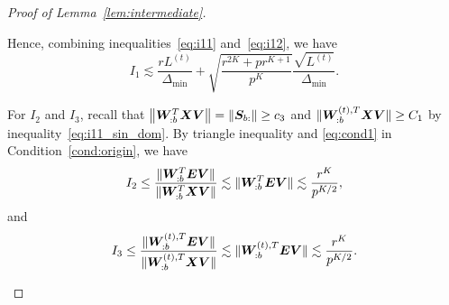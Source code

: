 \documentclass[lettersize,journal]{IEEEtran}
\theoremstyle{definition}
\theoremstyle{definition}
\newcommand{\of}[1]{\left(#1\right)}
\newcommand{\aabs}[1]{\left|#1\right|}
\begin{document}
\begin{proof}[Proof of Lemma~\ref{lem:intermediate}]
\begin{enumerate}
     
    Hence, combining inequalities~\eqref{eq:i11} and~\eqref{eq:i12},  we have 
    \begin{equation}\label{eq:i1}
        I_1 \lesssim \frac{r L^{(t)}}{\Delta_{\min}} + \sqrt{\frac{ r^{2K} + p r^{K+1}}{p^K}} \frac{\sqrt{L^{(t)}}}{\Delta_{\min}}.
    \end{equation}
    
    
    
    For $I_2$ and $I_3$, recall that $\left\lVert\bm{W}_{:b}^T \bm X \bm{V}\right\rVert = \left\lVert\bm S_{b:}\right\rVert \geq c_3$ and $\lVert  \bm{W}_{:b}^{(t),T} \bm X \bm{V} \rVert \geq C_1$ by inequality~\eqref{eq:i11_sin_dom}. By triangle inequality and \eqref{eq:cond1} in Condition~\ref{cond:origin}, we have 
    \begin{equation}\label{eq:i2}
         I_2 \leq \frac{ \onormSize{}{ \mW_{:b}^T \mE \mV } }{ \onormSize{}{\mW_{:b}^T \mX \mV}  } \lesssim  \onormSize{}{ \mW_{:b}^T \mE \mV }  \lesssim \frac{r^K}{p^{K/2}},
    \end{equation}
    and 
    \begin{equation}\label{eq:i3}
        I_3 \leq \frac{ \onormSize{}{ \mW_{:b}^{(t),T} \mE \mV } }{ \onormSize{}{\mW_{:b}^{(t),T} \mX \mV}  }  \lesssim \onormSize{}{ \mW_{:b}^{(t),T} \mE \mV } \lesssim \frac{r^K}{p^{K/2}}.
     \end{equation}
    
    
    

\end{enumerate}
\end{proof}
\end{document}
